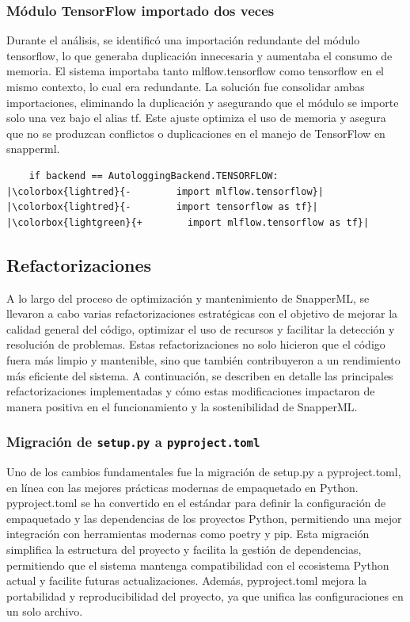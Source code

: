 \subsubsection{Módulo TensorFlow importado dos veces}
Durante el análisis, se identificó una importación redundante del módulo tensorflow, lo que generaba duplicación innecesaria y aumentaba el consumo de memoria. El sistema importaba tanto mlflow.tensorflow como tensorflow en el mismo contexto, lo cual era redundante. La solución fue consolidar ambas importaciones, eliminando la duplicación y asegurando que el módulo se importe solo una vez bajo el alias tf. Este ajuste optimiza el uso de memoria y asegura que no se produzcan conflictos o duplicaciones en el manejo de TensorFlow en \Gls{snapperml}.

\begin{verbatim}
    if backend == AutologgingBackend.TENSORFLOW:
|\colorbox{lightred}{-        import mlflow.tensorflow}|
|\colorbox{lightred}{-        import tensorflow as tf}|
|\colorbox{lightgreen}{+        import mlflow.tensorflow as tf}|
\end{verbatim}

\subsection{Refactorizaciones}
A lo largo del proceso de optimización y mantenimiento de SnapperML, se llevaron a cabo varias refactorizaciones estratégicas con el objetivo de mejorar la calidad general del código, optimizar el uso de recursos y facilitar la detección y resolución de problemas. Estas refactorizaciones no solo hicieron que el código fuera más limpio y mantenible, sino que también contribuyeron a un rendimiento más eficiente del sistema. A continuación, se describen en detalle las principales refactorizaciones implementadas y cómo estas modificaciones impactaron de manera positiva en el funcionamiento y la sostenibilidad de SnapperML.

\subsubsection{Migración de \texttt{setup.py} a \texttt{pyproject.toml}}
Uno de los cambios fundamentales fue la migración de setup.py a pyproject.toml, en línea con las mejores prácticas modernas de empaquetado en Python. pyproject.toml se ha convertido en el estándar para definir la configuración de empaquetado y las dependencias de los proyectos Python, permitiendo una mejor integración con herramientas modernas como poetry y pip. Esta migración simplifica la estructura del proyecto y facilita la gestión de dependencias, permitiendo que el sistema mantenga compatibilidad con el ecosistema Python actual y facilite futuras actualizaciones. Además, pyproject.toml mejora la portabilidad y reproducibilidad del proyecto, ya que unifica las configuraciones en un solo archivo.

